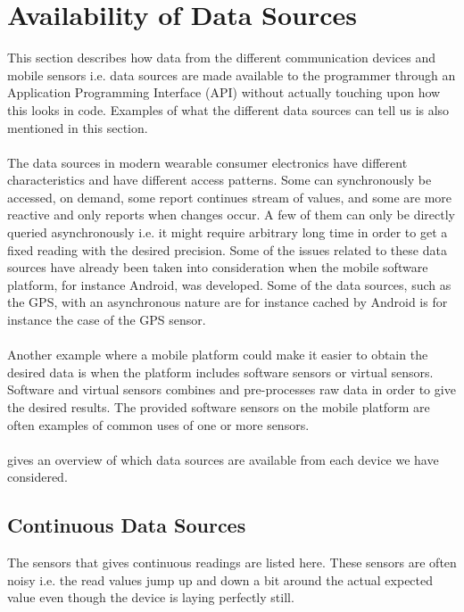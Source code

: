 
\section{Availability of Data Sources}
\label{sec:availability_of_data_sources}

This section describes how data from the different communication devices and mobile sensors i.e. data sources are made available to the programmer through an Application Programming Interface (API) without actually touching upon how this looks in code. Examples of what the different data sources can tell us is also mentioned in this section. 
\\\\
The data sources in modern wearable consumer electronics have different characteristics and have different access patterns. Some can synchronously be accessed, on demand, some report continues stream of values, and some are more reactive and only reports when changes occur. A few of them can only be directly queried asynchronously i.e. it might require arbitrary long time in order to get a fixed reading with the desired precision. Some of the issues related to these data sources have already been taken into consideration when the mobile software platform, for instance Android, was developed. Some of the data sources, such as the GPS, with an asynchronous nature are for instance cached by Android is for instance the case of the GPS sensor. 
\\\\
Another example where a mobile platform could make it easier to obtain the desired data is when the platform includes software sensors or virtual sensors. Software and virtual sensors combines and pre-processes raw data in order to give the desired results. The provided software sensors on the mobile platform are often examples of common uses of one or more sensors. 
\\\\
 gives an overview of which data sources are available from each device we have considered.
\\


\subsection{Continuous Data Sources}
\label{sub:continuous_sensors}
The sensors that gives continuous readings are listed here. These sensors are often noisy i.e. the read values jump up and down a bit around the actual expected value even though the device is laying perfectly still.

